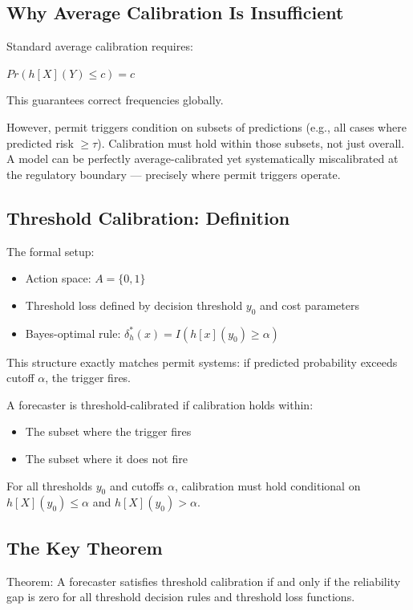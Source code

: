 \subsection{Why Average Calibration Is Insufficient}
Standard average calibration requires:

$Pr(h[X](Y) \le c) = c$

This guarantees correct frequencies globally.

However, permit triggers condition on subsets of predictions (e.g., all cases where predicted risk $\ge \tau$). Calibration must hold within those subsets, not just overall. A model can be perfectly average-calibrated yet systematically miscalibrated at the regulatory boundary — precisely where permit triggers operate.

\subsection{Threshold Calibration: Definition}
The formal setup:
\begin{itemize}
    \item  Action space: $A = \{0,1\}$
    \item Threshold loss defined by decision threshold $y_0$ and cost parameters
    \item Bayes-optimal rule: $\delta^*_h(x) = I(h[x](y_0) \ge \alpha)$
\end{itemize}

This structure exactly matches permit systems: if predicted probability exceeds cutoff $\alpha$, the trigger fires.

A forecaster is threshold-calibrated if calibration holds within:
\begin{itemize}
    \item The subset where the trigger fires
    \item The subset where it does not fire
\end{itemize}

For all thresholds $y_0$ and cutoffs $\alpha$, calibration must hold conditional on $h[X](y_0) \le \alpha$ and $h[X](y_0) > \alpha$.

\subsection{The Key Theorem }
Theorem:
A forecaster satisfies threshold calibration if and only if the reliability gap is zero for all threshold decision rules and threshold loss functions.

